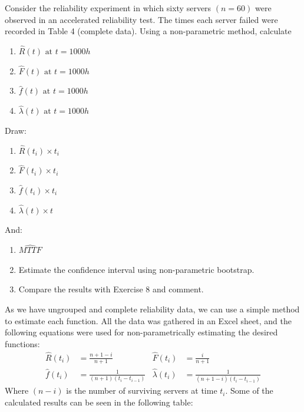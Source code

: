 \documentclass{article}
\begin{document}
\setcounter{Question}{8}
\begin{question}
    Consider the reliability experiment in which sixty servers \((n = 60)\) were observed in an accelerated reliability test. The times each server failed were recorded in Table 4 (complete data). Using a non-parametric method, calculate
    \begin{enumerate}[label=(\alph*)]
        \item \(\hat{R}(t) \text{ at } t = 1000h\)
        \item \(\hat{F}(t) \text{ at } t = 1000h\)
        \item \(\hat{f}(t) \text{ at } t = 1000h\)
        \item \(\hat{\lambda}(t) \text{ at } t = 1000h\)
    \end{enumerate}
    Draw:
    \begin{enumerate}[label=(\alph*), start=5]
        \item \(\hat{R}(t_i) \times t_i\)
        \item \(\hat{F}(t_i) \times t_i\)
        \item \(\hat{f}(t_i) \times t_i\)
        \item \(\hat{\lambda}(t) \times t\)
    \end{enumerate}
    And:
    \begin{enumerate}[label=(\alph*), start=9]
        \item \(\widehat{MTTF}\)
        \item Estimate the confidence interval using non-parametric bootstrap.
        \item Compare the results with Exercise 8 and comment.
    \end{enumerate}
\end{question}

As we have ungrouped and complete reliability data, we can use a simple method to estimate each function. All the data was gathered in an Excel sheet, and the following equations were used for non-parametrically estimating the desired functions:
    \begin{align*}
        \hat{R}(t_i) &= \frac{n+1-i}{n+1}    &   \hat{F}(t_i) &= \frac{i}{n+1} \\
        \hat{f}(t_i) &= \frac{1}{(n+1)(t_i - t_{i - 1})}   &   \hat{\lambda}(t_i) &= \frac{1}{(n+1-i)(t_i - t_{i-1})}
    \end{align*}
    Where $(n - i)$ is the number of surviving servers at time $t_i$. Some of the calculated results can be seen in the following table:
\end{document}
